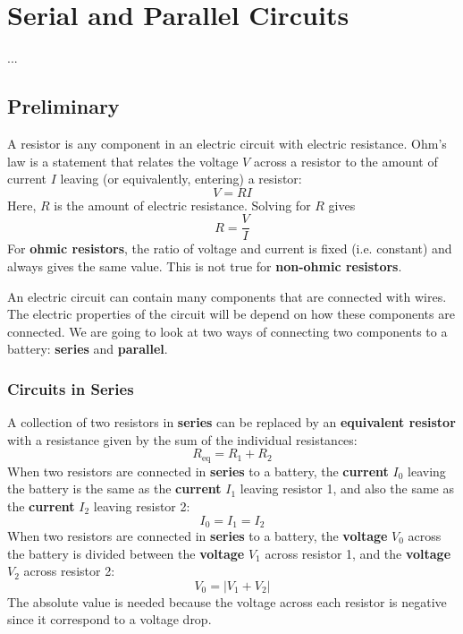 \chapter{Serial and Parallel Circuits}
...
\section{Preliminary}
A resistor is any component in an electric circuit with electric resistance. Ohm's law is a statement that relates the voltage $V$ across a resistor to the amount of current $I$ leaving (or equivalently, entering) a resistor:
\begin{equation}
	V = R I
\end{equation}
Here, $R$ is the amount of electric resistance. Solving for $R$ gives
\begin{equation} \label{eq.03.ROhmLaw}
	R = \frac{V}{I}
\end{equation}
For \textbf{ohmic resistors}, the ratio of voltage and current is fixed (i.e. constant) and always gives the same value. This is not true for \textbf{non-ohmic resistors}.

An electric circuit can contain many components that are connected with wires. The electric properties of the circuit will be depend on how these components are connected. We are going to look at two ways of connecting two components to a battery: \textbf{series} and \textbf{parallel}.
\subsection{Circuits in Series}
A collection of two resistors in \textbf{series} can be replaced by an \textbf{equivalent resistor} with a resistance given by the sum of the individual resistances:
\begin{equation} \label{eq.03.RSeries}
	R_{\text{eq}} = R_{1} + R_{2}
\end{equation}
When two resistors are connected in \textbf{series} to a battery, the \textbf{current} $I_{0}$ leaving the battery is the same as the \textbf{current} $I_{1}$ leaving resistor 1, and also the same as the \textbf{current} $I_{2}$ leaving resistor 2:
\begin{equation} \label{eq.03.ISeries}
	I_{0} = I_{1} = I_{2}
\end{equation}
When two resistors are connected in \textbf{series} to a battery, the \textbf{voltage} $V_{0}$ across the battery is divided between the \textbf{voltage} $V_{1}$ across resistor 1, and the \textbf{voltage} $V_{2}$ across resistor 2:
\begin{equation} \label{eq.03.VSeries}
	V_{0} = \left| V_{1} + V_{2} \right|
\end{equation}
The absolute value is needed because the voltage across each resistor is negative since it correspond to a voltage drop.

